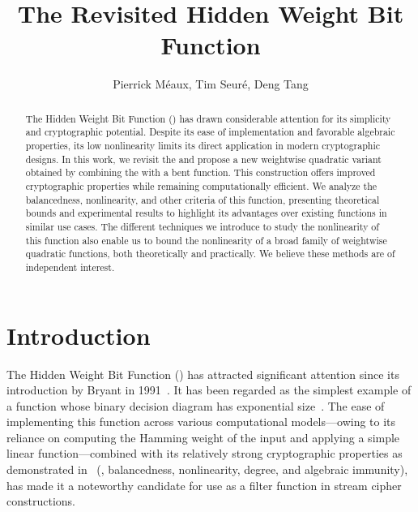 \documentclass{llncs}
\begin{document}
\setcounter{page}{1}

\title{The Revisited Hidden Weight Bit Function}

\ifnum{}
	\author{%
		Pierrick M\'eaux,
		Tim Seuré, 
		Deng Tang
	}
\else
	\author{}
	\institute{}
\fi

\maketitle	

\pagestyle{plain}
	
\begin{abstract}
	The Hidden Weight Bit Function (\hwbf{}) has drawn considerable attention for its simplicity and cryptographic potential. Despite its ease of implementation and favorable algebraic properties, its low nonlinearity limits its direct application in modern cryptographic designs. In this work, we revisit the \hwbf{} and propose a new weightwise quadratic variant obtained by combining the \hwbf{} with a bent function. This construction offers improved cryptographic properties while remaining computationally efficient. We analyze the balancedness, nonlinearity, and other criteria of this function, presenting theoretical bounds and experimental results to highlight its advantages over existing functions in similar use cases. The different techniques we introduce to study the nonlinearity of this function also enable us to bound the nonlinearity of a broad family of weightwise quadratic functions, both theoretically and practically. We believe these methods are of independent interest.

\end{abstract}

\section{Introduction}

The Hidden Weight Bit Function (\hwbf{}) has attracted significant attention since its introduction by Bryant in 1991~\cite{IEEE:Bryant91}. It has been regarded as the simplest example of a function whose binary decision diagram has exponential size~\cite{IEEE:Bryant91,TIA:BoLSW99}. The ease of implementing this function across various computational models—owing to its reliance on computing the Hamming weight of the input and applying a simple linear function—combined with its relatively strong cryptographic properties as demonstrated in~\cite{DAM:WCST14} (\eg, balancedness, nonlinearity, degree, and algebraic immunity), has made it a noteworthy candidate for use as a filter function in stream cipher constructions.
\end{document}
